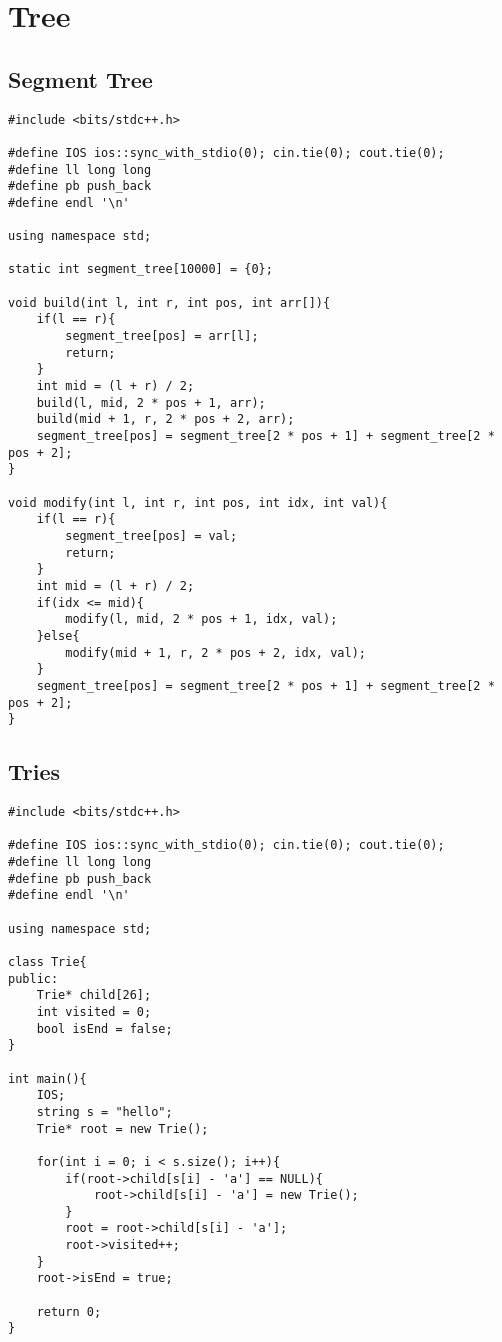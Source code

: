 \documentclass[12pt, a4paper]{article}
\begin{document}
\section{Tree}
\subsection{Segment Tree}
\begin{lstlisting}
#include <bits/stdc++.h>

#define IOS ios::sync_with_stdio(0); cin.tie(0); cout.tie(0);
#define ll long long
#define pb push_back
#define endl '\n'

using namespace std;

static int segment_tree[10000] = {0};

void build(int l, int r, int pos, int arr[]){
    if(l == r){
        segment_tree[pos] = arr[l];
        return;
    }
    int mid = (l + r) / 2;
    build(l, mid, 2 * pos + 1, arr);
    build(mid + 1, r, 2 * pos + 2, arr);
    segment_tree[pos] = segment_tree[2 * pos + 1] + segment_tree[2 * pos + 2];
}

void modify(int l, int r, int pos, int idx, int val){
    if(l == r){
        segment_tree[pos] = val;
        return;
    }
    int mid = (l + r) / 2;
    if(idx <= mid){
        modify(l, mid, 2 * pos + 1, idx, val);
    }else{
        modify(mid + 1, r, 2 * pos + 2, idx, val);
    }
    segment_tree[pos] = segment_tree[2 * pos + 1] + segment_tree[2 * pos + 2];
}
\end{lstlisting}

\subsection{Tries}
\begin{lstlisting}
#include <bits/stdc++.h>

#define IOS ios::sync_with_stdio(0); cin.tie(0); cout.tie(0);
#define ll long long
#define pb push_back
#define endl '\n'

using namespace std;

class Trie{
public:
    Trie* child[26];
    int visited = 0;
    bool isEnd = false;
}

int main(){
    IOS;
    string s = "hello";
    Trie* root = new Trie();

    for(int i = 0; i < s.size(); i++){
        if(root->child[s[i] - 'a'] == NULL){
            root->child[s[i] - 'a'] = new Trie();
        }
        root = root->child[s[i] - 'a'];
        root->visited++;
    }
    root->isEnd = true;
    
    return 0;
}
\end{lstlisting}
\end{document}
